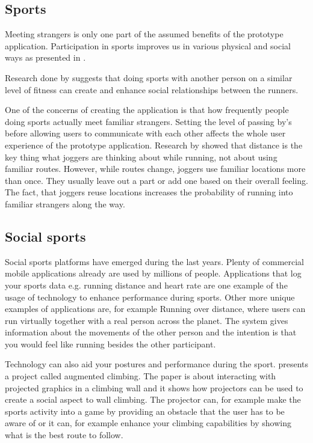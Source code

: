 \subsection{Sports}

Meeting strangers is only one part of the assumed benefits of the prototype application. Participation in sports improves us in various physical and social ways as presented in \citep{foundations}. 

Research done by \citep{joggingTheDistance} suggests that doing sports with another person on a similar level of fitness can create and enhance social relationships between the runners.


One of the concerns of creating the application is that how frequently people doing sports actually meet familiar strangers. Setting the level of passing by's before allowing users to communicate with each other affects the whole user experience of the prototype application. Research by \cite{runningNavigation} showed that distance is the key thing what joggers are thinking about while running, not about using familiar routes. However, while routes change, joggers use familiar locations more than once. They usually leave out a part or add one based on their overall feeling. The fact, that joggers reuse locations increases the probability of running into familiar strangers along the way.

\subsection{Social sports}

Social sports platforms have emerged during the last years. Plenty of commercial mobile applications already are used by millions of people. Applications that log your sports data e.g. running distance and heart rate are one example of the usage of technology to enhance performance during sports. Other more unique examples of applications are, for example Running over distance, where users can run virtually together with a real person across the planet. The system gives information about the movements of the other person and the intention is that you would feel like running besides the other participant.

Technology can also aid your postures and performance during the sport. \cite{augmentedClimbing} presents a project called augmented climbing. The paper is about interacting with projected graphics in a climbing wall and it shows how projectors can be used to create a social aspect to wall climbing. The projector can, for example make the sports activity into a game by providing an obstacle that the user has to be aware of or it can, for example enhance your climbing capabilities by showing what is the best route to follow.


